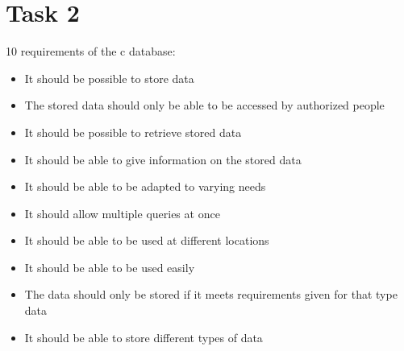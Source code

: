 \chapter{Task 2}

10 requirements of the c database:
\begin{itemize}
    \item It should be possible to store data
    \item The stored data should only be able to be accessed by authorized people
    \item It should be possible to retrieve stored data
    \item It should be able to give information on the stored data
    \item It should be able to be adapted to varying needs
    \item It should allow multiple queries at once
    \item It should be able to be used at different locations
    \item It should be able to be used easily
    \item The data should only be stored if it meets requirements given for that type data
    \item It should be able to store different types of data
\end{itemize} 
